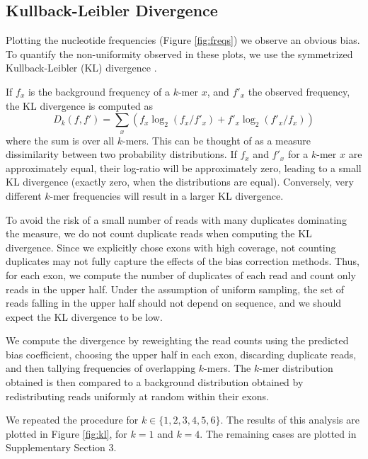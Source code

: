 \documentclass{bioinfo}
\begin{document}
\subsection{Kullback-Leibler Divergence}

Plotting the nucleotide frequencies (Figure  \ref{fig:freqs}) we observe an
obvious bias. To quantify the non-uniformity observed in these plots, we use the
symmetrized Kullback-Leibler (KL) divergence \citep{Kullback1951}.

If $f_x$ is the background frequency of a $k$-mer $x$, and $f'_x$ the observed
frequency, the KL divergence is computed as
$$D_k( f, f' ) = \sum_{x} \left( f_x \log_{2}( f_x / f'_x ) + f'_x \log_{2}( f'_x / f_x) \right)$$
where the sum is over all $k$-mers. This can be thought of as a measure
dissimilarity between two probability distributions. If $f_x$ and $f'_x$ for a
$k$-mer $x$ are approximately equal, their log-ratio will be approximately
zero, leading to a small KL divergence (exactly zero, when the distributions are equal).
Conversely, very different $k$-mer frequencies will result in a larger KL
divergence.

To avoid the risk of a small number of reads with many duplicates dominating the
measure, we do not count duplicate reads when computing the KL divergence. Since we
explicitly chose exons with high coverage, not counting duplicates may not
fully capture the effects of the bias correction methods. Thus, for each exon,
we compute the number of duplicates of each read and count only reads in the
upper half. Under the assumption of uniform sampling, the set of reads falling
in the upper half should not depend on sequence, and we should expect the KL
divergence to be low.

We compute the divergence by reweighting the read counts using the predicted
bias coefficient, choosing the upper half in each exon, discarding duplicate
reads, and then tallying frequencies of overlapping $k$-mers. The $k$-mer
distribution obtained is then compared to a background distribution obtained by
redistributing reads uniformly at random within their exons.

We repeated the procedure for $k \in \{1, 2, 3, 4, 5, 6\}$. The results of this
analysis are plotted in Figure \ref{fig:kl}, for $k = 1$ and $k = 4$. The
remaining cases are plotted in Supplementary Section 3.
\end{document}
